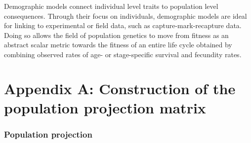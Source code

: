\documentclass[11pt]{article}
\begin{document}
Demographic models connect individual level traits to population level consequences. Through their focus on individuals, demographic models are ideal for linking to experimental or field data, such as capture-mark-recapture data. Doing so allows the field of population genetics to move from fitness as an abstract scalar metric towards the fitness of an entire life cycle obtained by combining observed rates of age- or stage-specific survival and fecundity rates.  



 










\newpage{}

\section{Appendix A: Construction of the population projection matrix}

\subsubsection*{Population projection}
\end{document}
